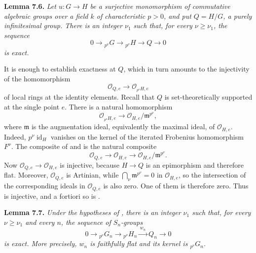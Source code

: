 \medskip
\noindent{}\textbf{Lemma 7.6.}
\textit{Let \(u:G\to H\) be a surjective monomorphism of commutative
algebraic groups over a field \(k\) of characteristic \(p>0\), and put
\(Q=H/G\), a purely infinitesimal group. There is an integer \(\nu_1\) such
that, for every \(\nu\geq\nu_1\), the sequence}
\[
  0\longrightarrow{}_{p^\nu}G
  \longrightarrow{}_{p^\nu}H
  \longrightarrow Q\longrightarrow0
\]
\textit{is exact.}

It is enough to establish exactness at \(Q\), which in turn amounts to the
injectivity of the homomorphism
\begin{equation}
  \tag{x}
  \mathscr O_{Q,e}\longrightarrow
  \mathscr O_{{}_{p^\nu}H,e}
\end{equation}
of local rings at the identity elements. Recall that \(Q\) is
set-theoretically supported at the single point \(e\). There is a natural
homomorphism
\begin{equation}
  \tag{xx}
  \mathscr O_{{}_{p^\nu}H,e}
  \longrightarrow
  \mathscr O_{H,e}/\mathfrak m^{p^\nu},
\end{equation}
where \(\mathfrak m\) is the augmentation ideal, equivalently the maximal
ideal, of \(\mathscr O_{H,e}\). Indeed,
\(p^\nu\operatorname{id}_H\) vanishes on the kernel of the iterated
Frobenius homomorphism \(F^\nu\). The composite of
 and
 is the
natural composite
\begin{equation}
  \tag{xxx}
  \mathscr O_{Q,e}\longrightarrow
  \mathscr O_{H,e}\longrightarrow
  \mathscr O_{H,e}/\mathfrak m^{p^\nu}.
\end{equation}
Now \(\mathscr O_{Q,e}\to\mathscr O_{H,e}\) is injective, because
\(H\to Q\) is an epimorphism and therefore flat. Moreover,
\(\mathscr O_{Q,e}\) is Artinian, while
\(\bigcap_\nu\mathfrak m^{p^\nu}=0\) in \(\mathscr O_{H,e}\), so the
intersection of the corresponding ideals in \(\mathscr O_{Q,e}\) is also
zero. One of them is therefore zero. Thus
 is
injective, and a fortiori so is
.

\medskip
\noindent{}\textbf{Lemma 7.7.}
\textit{Under the hypotheses of , there is an integer \(\nu_1\) such
that, for every \(\nu\geq\nu_1\) and every \(n\), the sequence of
\(S_n\)-groups}
\[
  0\longrightarrow{}_{p^\nu}G_n
  \longrightarrow{}_{p^\nu}H_n
  \xrightarrow{\,w_n\,}Q_n
  \longrightarrow0
\]
\textit{is exact. More precisely, \(w_n\) is faithfully flat and its kernel
is \({}_{p^\nu}G_n\).}

